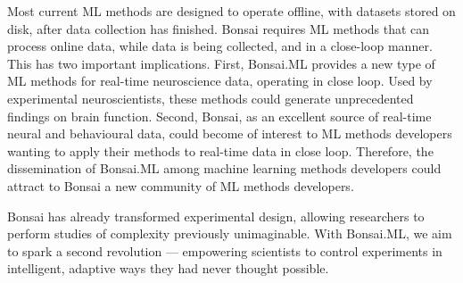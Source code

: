 Most current ML methods are designed to operate offline, with datasets stored
on disk, after data collection has finished.
%
Bonsai requires ML methods that can process online data, while data is being
collected, and in a close-loop manner.
%
This has two important implications.
%
First, Bonsai.ML provides a new type of ML methods for real-time neuroscience
data, operating in close loop. Used by experimental neuroscientists, these
methods could generate unprecedented findings on brain function.
%
Second, Bonsai, as an excellent source of real-time neural and behavioural data,
could become of interest to ML methods developers wanting to apply their
methods to real-time data in close loop.
%
Therefore, the dissemination of Bonsai.ML among machine learning methods
developers could attract to Bonsai a new community of ML methods developers.

Bonsai has already transformed experimental design, allowing researchers to
perform studies of complexity previously unimaginable. With Bonsai.ML, we aim
to spark a second revolution — empowering scientists to control experiments in
intelligent, adaptive ways they had never thought possible.


